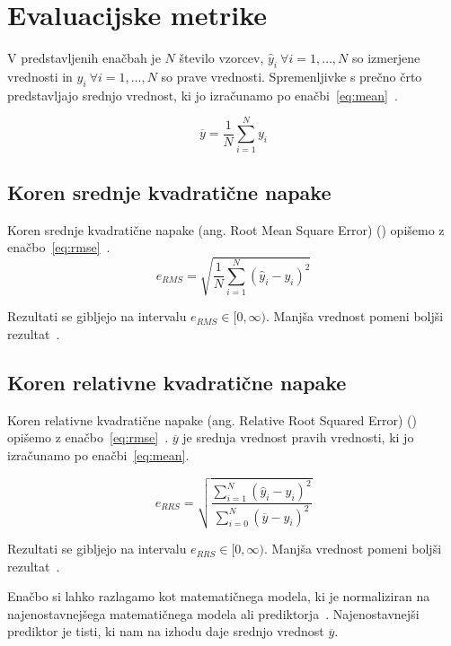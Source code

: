 \section{Evaluacijske metrike}
V predstavljenih enačbah je $N$ število vzorcev, $\hat{y}_i~ \forall i=1,\ldots,N$ so izmerjene vrednosti in $y_i ~\forall i=1,\ldots,N$ so prave vrednosti. Spremenljivke s prečno črto predstavljajo srednjo vrednost, ki jo izračunamo po enačbi~\eqref{eq:mean}~\cite{witten2005data}.

\begin{equation}
\overline{y} = \frac{1}{N} \sum_{i=1}^N y_i
\label{eq:mean}
\end{equation}


\subsection{Koren srednje kvadratične napake}
Koren srednje kvadratične napake (ang. Root Mean Square Error) (\rmse) opišemo z enačbo~\eqref{eq:rmse}~\cite{witten2005data}.
\begin{equation}
e_{RMS} = \sqrt{\frac{1}{N} \sum_{i=1}^{N}\left( \hat{y}_i - y_i \right)^2}
\label{eq:rmse}
\end{equation}

Rezultati se gibljejo na intervalu $e_{RMS} \in [0, \infty)$. Manjša vrednost pomeni boljši rezultat~\cite{witten2005data}.

\subsection{Koren relativne kvadratične napake}
Koren relativne kvadratične napake (ang. Relative Root Squared Error) (\rrse) opišemo z enačbo~\eqref{eq:rmse}~\cite{witten2005data}. $\overline{y}$ je srednja vrednost pravih vrednosti, ki jo izračunamo po enačbi~\eqref{eq:mean}.

\begin{equation}
e_{RRS} = \sqrt{\frac{\sum_{i=1}^{N} \left ( \hat{y}_i - y_i \right )^2}{\sum_{i=0}^{N} \left( \overline{y} - y_i \right)^2}}
\label{eq:rrse}
\end{equation}

Rezultati se gibljejo na intervalu $e_{RRS} \in [0, \infty)$. Manjša vrednost pomeni boljši rezultat~\cite{witten2005data}.

Enačbo si lahko razlagamo kot \rmse matematičnega modela, ki je normaliziran na \rmse najenostavnejšega matematičnega modela ali prediktorja~\cite{witten2005data}. Najenostavnejši prediktor je tisti, ki nam na izhodu daje srednjo vrednost $\overline{y}$. 

